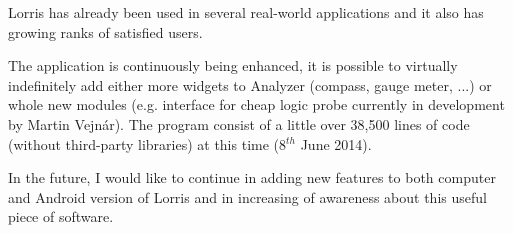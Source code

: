 \documentclass[12pt, a4paper, oneside]{article}
\begin{document}
Lorris has already been used in several real-world applications and it also has growing ranks of satisfied users.

The application is continuously being enhanced, it is possible to virtually indefinitely add either more widgets to Analyzer (compass, gauge meter, ...) or whole new modules (e.g. interface for cheap logic probe currently in development by Martin Vejnár). The program consist of a little over 38,500 lines of code (without third-party libraries) at this time (8$^{th}$ June 2014).

In the future, I would like to continue in adding new features to both computer and Android version of Lorris and in increasing of awareness about this useful piece of software.

\end{document}
